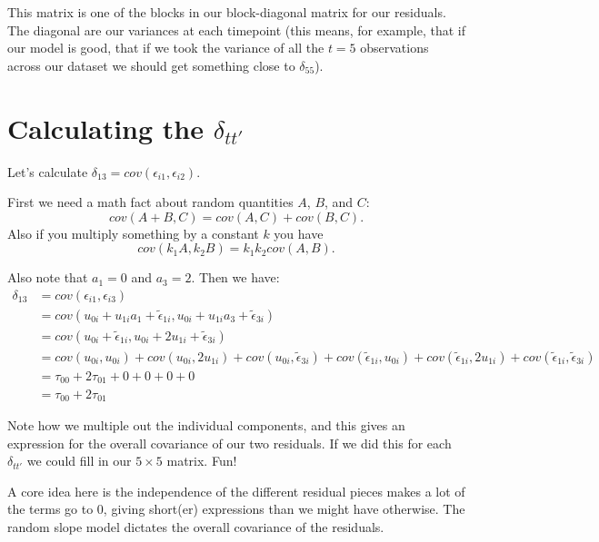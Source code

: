 \documentclass[
  letterpaper,
  DIV=11,
  numbers=noendperiod]{scrreprt}
\begin{document}
This matrix is one of the blocks in our block-diagonal matrix for our
residuals. The diagonal are our variances at each timepoint (this means,
for example, that if our model is good, that if we took the variance of
all the \(t=5\) observations across our dataset we should get something
close to \(\delta_{55}\)).

\hypertarget{calculating-the-delta_tt}{%
\section*{\texorpdfstring{Calculating the
\(\delta_{tt'}\)}{Calculating the \textbackslash delta\_\{tt\textquotesingle\}}}\label{calculating-the-delta_tt}}


Let's calculate \(\delta_{13} = cov( \epsilon_{i1}, \epsilon_{i2} )\).

First we need a math fact about random quantities \(A\), \(B\), and
\(C\): \[cov( A + B, C ) = cov( A, C ) + cov( B, C ) .\] Also if you
multiply something by a constant \(k\) you have
\[cov( k_1 A, k_2 B ) = k_1 k_2 cov( A, B ) .\]

Also note that \(a_1 = 0\) and \(a_3 = 2\). Then we have:
\[\begin{aligned}
\delta_{13} &= cov( \epsilon_{i1}, \epsilon_{i3} ) \\
   &= cov(  u_{0i} + u_{1i} a_1 + \tilde{\epsilon}_{1i},  u_{0i} + u_{1i} a_3 + \tilde{\epsilon}_{3i} ) \\
   &= cov(  u_{0i}  + \tilde{\epsilon}_{1i},  u_{0i} + 2 u_{1i} + \tilde{\epsilon}_{3i} ) \\
   &= cov(  u_{0i}, u_{0i} ) + cov( u_{0i}, 2 u_{1i} ) + cov( u_{0i}, \tilde{\epsilon}_{3i} ) + cov( \tilde{\epsilon}_{1i}, u_{0i}) + cov( \tilde{\epsilon}_{1i}, 2 u_{1i} )  + cov( \tilde{\epsilon}_{1i}, \tilde{\epsilon}_{3i}) \\
   &= \tau_{00} + 2\tau_{01} + 0 + 0 + 0 + 0 \\
   &= \tau_{00} + 2\tau_{01} 
\end{aligned}\]

Note how we multiple out the individual components, and this gives an
expression for the overall covariance of our two residuals. If we did
this for each \(\delta_{tt'}\) we could fill in our \(5 \times 5\)
matrix. Fun!

A core idea here is the independence of the different residual pieces
makes a lot of the terms go to 0, giving short(er) expressions than we
might have otherwise. The random slope model dictates the overall
covariance of the residuals.
\end{document}
